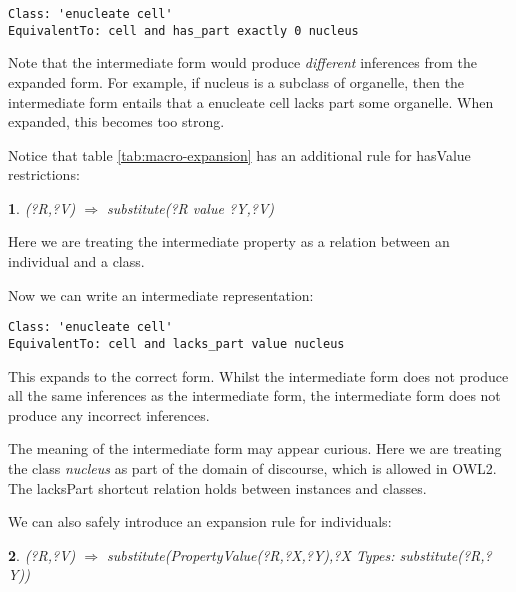 \documentclass{llncs}
\newtheorem{expr}{}[section]
\begin{document}
\begin{verbatim}
Class: 'enucleate cell'
EquivalentTo: cell and has_part exactly 0 nucleus
\end{verbatim}


Note that the intermediate form would produce \emph{different}
inferences from the expanded form. For example, if nucleus is a
subclass of organelle, then the intermediate form entails that a
enucleate cell lacks part some organelle. When expanded, this becomes
too strong.

Notice that table \ref{tab:macro-expansion} has an additional rule for
hasValue restrictions:

\begin{expr}\label{exp-some}
(?R,?V)  $\Rightarrow$ substitute(?R value ?Y,?V)
\end{expr}

Here we are treating the intermediate property as a relation between
an individual and a class.

Now we can write an intermediate representation:

\begin{verbatim}
Class: 'enucleate cell'
EquivalentTo: cell and lacks_part value nucleus
\end{verbatim}


This expands to the correct form. Whilst the intermediate form does
not produce all the same inferences as the intermediate form, the
intermediate form does not produce any incorrect inferences.


The meaning of the intermediate form may appear curious.  Here we are
treating the class \emph{nucleus} as part of the domain of discourse,
which is allowed in OWL2. The lacksPart shortcut relation holds between
instances  and classes.

We can also safely introduce an expansion rule for individuals:

\begin{expr}\label{exp-inst}
(?R,?V)  $\Rightarrow$ \newline
substitute(PropertyValue(?R,?X,?Y),?X Types: substitute(?R,?Y))
\end{expr}
\end{document}
